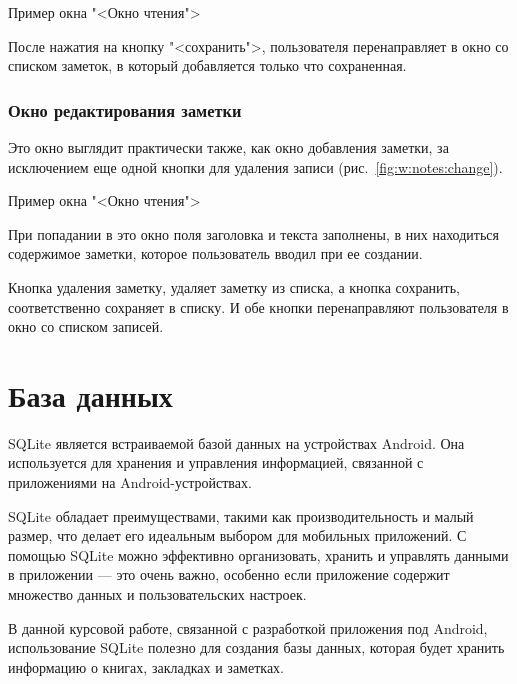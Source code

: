 \begin{image}
	\caption{Пример окна "<Окно чтения">}
	\label{fig:w:notes:add}
\end{image}

После нажатия на кнопку "<сохранить">, пользователя перенаправляет в
окно со списком заметок, в который добавляется только что сохраненная.

\subsubsection{Окно редактирования заметки}\label{sct:note:change}
Это окно выглядит практически также, как окно добавления заметки, за
исключением еще одной кнопки для удаления записи
(рис.~\ref{fig:w:notes:change}).\par

\begin{image}
	\caption{Пример окна "<Окно чтения">}
	\label{fig:w:notes:change}
\end{image}

При попадании в это окно поля заголовка и текста заполнены, в них
находиться содержимое заметки, которое пользователь вводил при ее
создании.\par
Кнопка удаления заметку, удаляет заметку из списка, а кнопка
сохранить, соответственно сохраняет в списку. И обе кнопки перенаправляют
пользователя в окно со списком записей.

\section{База данных}
SQLite является встраиваемой базой данных на устройствах Android.
Она используется для хранения и управления информацией,
связанной с приложениями на Android-устройствах. \par
SQLite обладает преимуществами, такими как производительность и малый размер,
что делает его идеальным выбором для мобильных приложений.
С помощью SQLite можно эффективно организовать, хранить и управлять данными
в приложении --- это очень важно, особенно если приложение
содержит множество данных и пользовательских настроек.\par
В данной курсовой работе, связанной с разработкой приложения под Android,
использование SQLite полезно для создания базы данных,
которая будет хранить информацию о книгах, закладках и заметках.\par

